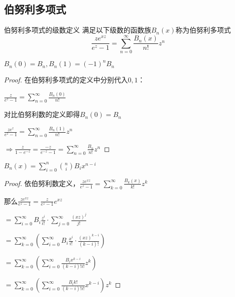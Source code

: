 \documentclass[12pt, a4paper, oneside, UTF8]{ctexbook}
\begin{document}
		\subsection{伯努利多项式}
		\begin{para}{0}
			\begin{defn}{伯努利多项式的级数定义}{}
				满足以下级数的函数族$B_n(x)$称为伯努利多项式
				\begin{equation}
					\frac{z e^{xz}}{e^z-1}=\sum\limits_{n=0}^{\infty} \frac{B_n(x)}{n!}z^n
				\end{equation}
			\end{defn}
			\begin{para}{1}
				\point{}
				\begin{proposition}
					$B_n(0)=B_n,B_n(1)=(-1)^{n}B_n$
				\end{proposition}
				\begin{proof}
					在伯努利多项式的定义中分别代入$0,1$：
					
					$\frac{z}{e^z-1}=\sum\limits_{n=0}^{\infty} \frac{B_n(0)}{n!}$
					
					对比伯努利数的定义即得$B_n(0) = B_n$
					
					$\frac{z e^z}{e^z-1}=\sum\limits_{n=0}^{\infty} \frac{B_n(1)}{n!}z^n$
					
					$\Rightarrow\frac{z}{1-e^{-z}}=\frac{-z}{e^{-z}-1} = \sum\limits_{n=0}^{\infty} \frac{B_n}{n!}z^n$
				\end{proof}
				\point{}
				\begin{proposition}
					$B_n(x) = \sum\limits_{i=0}^{n} \binom{n}{i}B_i x^{n-i}$
				\end{proposition}
				\begin{proof}
					依伯努利数定义，$\frac{z e^{xz}}{e^z-1}=\sum\limits_{k=0}^{\infty} \frac{B_k(x)}{k!}z^k$
					
					那么$\frac{z e^{xz}}{e^z-1}=\frac{z}{e^z-1} e^{xz}$
					
					$=\sum\limits_{i=0}^{\infty} B_i \frac{z^i}{i!} \cdot \sum\limits_{j=0}^{\infty} \frac{(xz)^j}{j!}$
					
					$=\sum\limits_{k=0}^{\infty} \left(\sum\limits_{i=0}^{\infty} B_i \frac{x^i}{i!}\cdot \frac{(xz)^{k-i}}{(k-i)!}\right)$
					
					$=\sum\limits_{k=0}^{\infty} \left(\sum\limits_{i=0}^{\infty} \frac{B_i x^{k-i}}{(k-i)!i!}z^k\right)$
					
					$=\sum\limits_{k=0}^{\infty} \left(\sum\limits_{i=0}^{\infty} \frac{B_i k!}{(k-i)!i!}x^{k-i}\right) z^k$
					

\end{proof}
\end{para}
\end{para}
\end{document}
